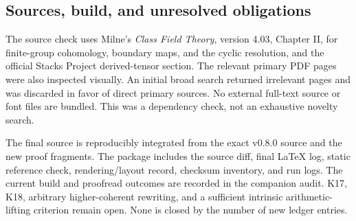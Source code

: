 \subsection{Sources, build, and unresolved obligations}
The source check uses Milne's \emph{Class Field Theory}, version 4.03, Chapter II, for finite-group cohomology, boundary maps, and the cyclic resolution, and the official Stacks Project derived-tensor section. The relevant primary PDF pages were also inspected visually. An initial broad search returned irrelevant pages and was discarded in favor of direct primary sources. No external full-text source or font files are bundled. This was a dependency check, not an exhaustive novelty search.

The final source is reproducibly integrated from the exact v0.8.0 source and the new proof fragments. The package includes the source diff, final LaTeX log, static reference check, rendering/layout record, checksum inventory, and run logs. The current build and proofread outcomes are recorded in the companion audit. K17, K18, arbitrary higher-coherent rewriting, and a sufficient intrinsic arithmetic-lifting criterion remain open. None is closed by the number of new ledger entries.

